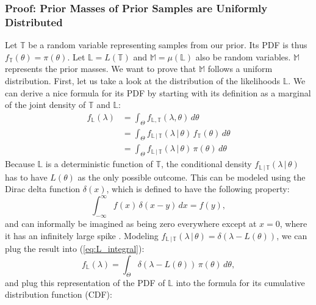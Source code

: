 \documentclass[12pt, a4paper]{report}
\begin{document}
\subsubsection{Proof: Prior Masses of Prior Samples are Uniformly Distributed}
Let $\mathbb{T}$ be a random variable representing samples from our prior.
Its PDF is thus $f_{\mathbb{T}}(\theta) = \pi(\theta)$.
Let $\mathbb{L} = L(\mathbb{T})$ and $\mathbb{M} = \mu(\mathbb{L})$ also be random variables.
$\mathbb{M}$ represents the prior masses.
We want to prove that $\mathbb{M}$ follows a uniform distribution.
First, let us take a look at the distribution of the likelihoods $\mathbb{L}$.
We can derive a nice formula for its PDF by starting with its definition as a marginal of the joint density of $\mathbb{T}$ and $\mathbb{L}$:
\begin{align}
    f_\mathbb{L}(\lambda) &= \int_\Theta f_{\mathbb{L}, \mathbb{T}}(\lambda, \theta) \, d\theta \nonumber\\
    &= \int_\Theta f_{\mathbb{L} \,|\, \mathbb{T}}(\lambda \,|\, \theta) \, f_\mathbb{T}(\theta) \, d\theta \nonumber\\
    &= \int_\Theta f_{\mathbb{L} \,|\, \mathbb{T}}(\lambda \,|\, \theta) \, \pi(\theta) \, d\theta \label{eq:L_integral}
\end{align}
Because $\mathbb{L}$ is a deterministic function of $\mathbb{T}$, the conditional density $f_{\mathbb{L} \,|\, \mathbb{T}}(\lambda \,|\, \theta)$ has to have $L(\theta)$ as the only possible outcome.
This can be modeled using the Dirac delta function $\delta(x)$, which is defined to have the following property:
\begin{equation}
    \int_{-\infty}^\infty f(x) \, \delta(x - y) \, dx = f(y), \label{eq:dirac_delta_property}
\end{equation}
and can informally be imagined as being zero everywhere except at $x=0$, where it has an infinitely large spike \cite[600]{mckay}.
Modeling $f_{\mathbb{L} \,|\, \mathbb{T}}(\lambda \,|\, \theta) = \delta(\lambda - L(\theta))$, we can plug the result into (\ref{eq:L_integral}):
\begin{equation*}
    f_\mathbb{L}(\lambda) = \int_\Theta \delta(\lambda - L(\theta)) \, \pi(\theta) \, d\theta,
\end{equation*}
and plug this representation of the PDF of $\mathbb{L}$ into the formula for its cumulative distribution function (CDF):
\end{document}
